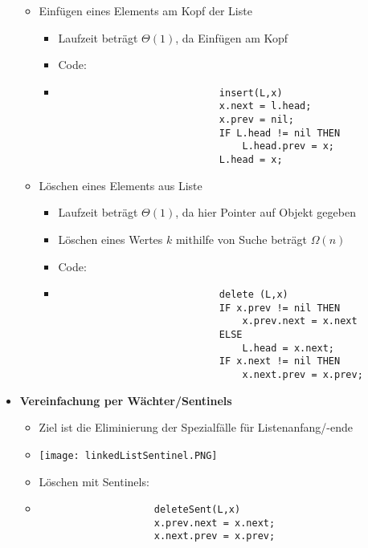 \begin{itemize}
\begin{itemize}
                \item Einfügen eines Elements am Kopf der Liste 
                    \begin{itemize}
                        \item Laufzeit beträgt $\Theta(1)$, da Einfügen am Kopf 
                        \item Code:
                        \item[] 
                            \begin{verbatim}
                            insert(L,x)
                            x.next = l.head;
                            x.prev = nil;
                            IF L.head != nil THEN 
                                L.head.prev = x;
                            L.head = x;
                            \end{verbatim}
                    \end{itemize}

                \item Löschen eines Elements aus Liste
                    \begin{itemize}
                        \item Laufzeit beträgt $\Theta(1)$, da hier Pointer auf Objekt gegeben
                        \item[] Löschen eines Wertes $k$ mithilfe von Suche beträgt $\Omega(n)$
                        \item Code:
                        \item[]
                            \begin{verbatim}
                            delete (L,x)
                            IF x.prev != nil THEN
                                x.prev.next = x.next
                            ELSE 
                                L.head = x.next;
                            IF x.next != nil THEN
                                x.next.prev = x.prev;
                            \end{verbatim} 
                    \end{itemize}
            \end{itemize}

        \item \textbf{Vereinfachung per Wächter/Sentinels}
            \begin{itemize}
                \item Ziel ist die Eliminierung der Spezialfälle für Listenanfang/-ende 
                \item[] \texttt{[image: linkedListSentinel.PNG]}
                \item Löschen mit Sentinels:
                \item[]
                    \begin{verbatim}
                    deleteSent(L,x)
                    x.prev.next = x.next;
                    x.next.prev = x.prev;
                    \end{verbatim}
            \end{itemize}
    \end{itemize}

